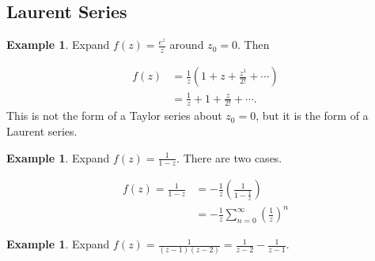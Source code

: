 \documentclass[12pt]{article}
\newcommand{\abs}[1]{ \left| #1 \right| }
\theoremstyle{definition}
\newtheorem{exmp}[thm]{Example}
\theoremstyle{remark}
\numberwithin{equation}{section}
\begin{document}
\subsection{Laurent Series}%
\label{sub:laurent_series}


\begin{exmp}
  Expand $f(z) = \frac{e^z}{z}$ around $z_0 = 0$. Then

  \begin{align}
    f(z) &= \frac{1}{z} \left( 1 + z + \frac{z^1}{2!} + \cdots \right)\\
         &= \frac{1}{z} + 1 + \frac{z}{2!} + \cdots.
  \end{align}
  This is not the form of a Taylor series about $z_0 = 0$, but it is the form of a Laurent series.
\end{exmp}

\begin{exmp}
  Expand $f(z) = \frac{1}{1-z}$. There are two cases.



  \begin{align}
    f(z) = \frac{1}{1-z} &= -\frac{1}{z} \left( \frac{1}{1 - \frac{1}{z}} \right) \\
                         &= - \frac{1}{z} \sum_{n=0}^\infty \left( \frac{1}{z} \right)^n
  \end{align}
\end{exmp}

\begin{exmp}
  Expand $f(z) = \frac{1}{(z-1)(z-2)} = \frac{1}{z-2} - \frac{1}{z-1}$.
\end{exmp}
\end{document}

